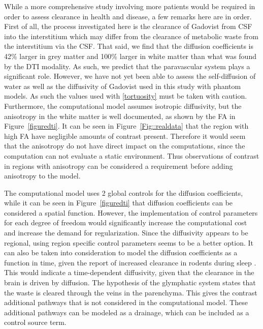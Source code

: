 \documentclass[12pt,a4paper]{article}
\begin{document}
While a more comprehensive study involving more patients would be required in order to assess clearance in health and disease, a few remarks here are in order. 
First of all, the process investigated here is the clearance of Gadovist from CSF into the interstitium which may differ from the clearance of metabolic waste 
from the interstitium via the CSF. That said, 
we find that the diffusion coefficients is 42\% larger in grey matter and 100\% larger in white matter than what was found by the DTI modality. As such, we predict that the paravascular system 
plays a significant role.  
However, we have not yet been able to assess the self-diffusion of water as well as the diffusivity of Gadovist used in this study with phantom models. As such 
the values used with \eqref{tortuosity} must be taken with caution. Furthermore,    
the computational model assumes isotropic diffusivity, but the anisotropy in the white matter is well documented, as shown by the FA in Figure~\ref{figuredti}. It can be seen in Figure~\ref{Fig::realdata} that the region with high FA have negligible amounts of contrast present. Therefore it would seem that the anisotropy do not have direct impact on the computations, since the computation can not evaluate a static environment. Thus observations of contrast in regions with anisotropy can be considered a requirement before adding anisotropy to the model.

The computational model uses 2 global controls for the diffusion coefficients, while it can be seen in  Figure~\ref{figuredti} that diffusion coefficients can be considered a spatial function. However, the implementation of control parameters for each degree of freedom would significantly increase the computational cost and increase the demand for regularization. Since the diffusivity appears to be regional, using region specific control parameters seems to be a better option.
It can also be taken into consideration to model the diffusion coefficients as a function in time, given the report of increased clearance in rodents during sleep \cite{xie2013sleep}. This would indicate a time-dependent diffusivity, given that the clearance in the brain is driven by diffusion. %
The hypothesis of the glymphatic system \cite{iliff2012paravascular} states that the waste is cleared through the veins in the parenchyma. This gives the contrast additional pathways that is not considered in the computational model. These additional pathways can be modeled as a drainage, which can be included as a control source term. 
\end{document}
